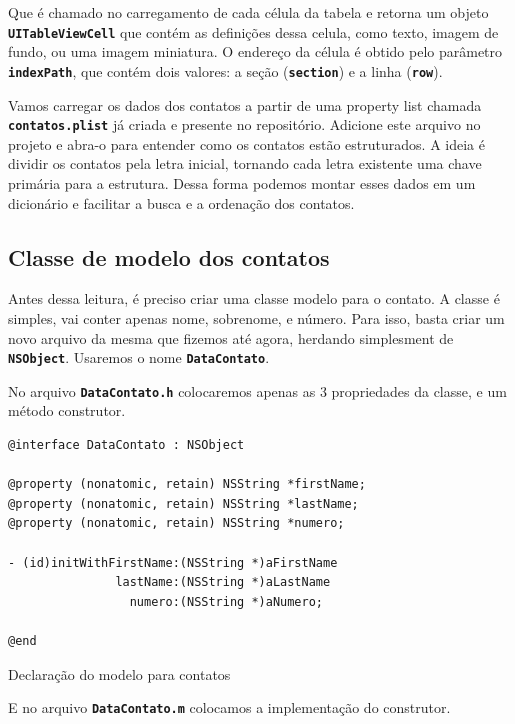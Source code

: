 \documentclass[a4paper,12pt,brazil,doubleside]{book}
\begin{document}
\begin{singlespace}
Que é chamado no carregamento de cada célula da tabela e retorna um objeto \texttt{\textbf{UITableViewCell}} que contém as definições dessa celula, como texto, imagem de fundo, ou uma imagem miniatura. O endereço da célula é obtido pelo parâmetro \texttt{\textbf{indexPath}}, que contém dois valores: a seção (\texttt{\textbf{section}}) e a linha (\texttt{\textbf{row}}).

Vamos carregar os dados dos contatos a partir de uma property list chamada \texttt{\textbf{contatos.plist}} já criada e presente no repositório. Adicione este arquivo no projeto e abra-o para entender como os contatos estão estruturados. A ideia é dividir os contatos pela letra inicial, tornando cada letra existente uma chave primária para a estrutura. Dessa forma podemos montar esses dados em um dicionário e facilitar a busca e a ordenação dos contatos.

\bigskip

\subsection{Classe de modelo dos contatos}


Antes dessa leitura, é preciso criar uma classe modelo para o contato. A classe é simples, vai conter apenas nome, sobrenome, e número. Para isso, basta criar um novo arquivo da mesma que fizemos até agora, herdando simplesment de \texttt{\textbf{NSObject}}. Usaremos o nome \texttt{\textbf{DataContato}}.

No arquivo \texttt{\textbf{DataContato.h}} colocaremos apenas as 3 propriedades da classe, e um método construtor.

\begin{listing}[H]
\begin{verbatim}
@interface DataContato : NSObject

@property (nonatomic, retain) NSString *firstName;
@property (nonatomic, retain) NSString *lastName;
@property (nonatomic, retain) NSString *numero;

- (id)initWithFirstName:(NSString *)aFirstName
               lastName:(NSString *)aLastName
                 numero:(NSString *)aNumero;

@end
\end{verbatim}
\caption{Declaração do modelo para contatos}
\end{listing}


E no arquivo \texttt{\textbf{DataContato.m}} colocamos a implementação do construtor.


\end{singlespace}
\end{document}
